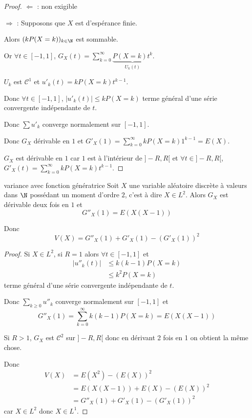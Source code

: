 \begin{proof}
    $\Leftarrow$ : non exigible 

    $\Rightarrow$ : Supposons que $X$ est d'espérance finie.
    

    Alors 
    $(k P(X = k))_{k \in \N}$ est sommable. 

    Or $\forall t \in [-1, 1]$, $G_X(t) = \sum_{k = 0}^{\infty} \underbrace{P(X = k) t^k}_{U_k(t)}$.

    $U_k$ est $\mathscr C^1$ et $u'_k(t) = k P(X = k) t^{k - 1}$.

    Donc $\forall t \in [-1, 1]$, $|u'_k(t)| \leqslant k P(X = k)$ terme général d'une série convergente 
    indépendante de $t$. 

    Donc $\sum u'_k$ converge normalement sur $[-1, 1]$.

    Donc $G_X$ dérivable en $1$ et $\displaystyle G'_X(1) = \sum_{k = 0}^{\infty} k P(X = k) 1^{k - 1} = E(X)$.


    $G_X$ est dérivable en $1$ car $1$ est à l'intérieur de $]-R, R[$
    et $\forall t \in ]-R, R[$, $\displaystyle G'_X(t) = \sum_{k = 0}^{\infty} k P(X = k) t^{k - 1}$.
\end{proof}

\begin{corollaire}{variance avec fonction génératrice}{}
    Soit $X$ une variable aléatoire discrète à  valeurs dans $\N$ possédant un moment 
    d'ordre $2$, c'est à dire $X \in L^2$. Alors 
    $G_X$ est dérivable deux fois en $1$ et
    $$ G''_X(1) = E(X(X - 1)) $$

    Donc $$ V(X) = G''_X(1) + G'_X(1) - (G'_X(1))^2 $$
\end{corollaire}

\begin{proof}
    Si $X \in L^2$, si $R = 1$ alors 
    $\forall t \in [-1, 1]$ et 
    \begin{align}
        |u''_k(t)| & \leqslant k(k - 1) P(X = k) \\
        & \leqslant k^2 P(X = k)
    \end{align}
    terme général d'une série convergente indépendante de $t$.

    Donc $\sum_{k \geqslant 0} u''_k$ converge normalement sur $[-1, 1]$ et 
    $$G''_X(1) = \sum_{k = 0}^{\infty} k (k - 1) P(X = k) = E(X(X - 1))$$

    Si $R > 1$, $G_X$ est $\mathscr C^2$ sur $]-R, R[$ donc en dérivant 2 fois en 1 on obtient 
    la même chose.

    Donc \begin{align}
        V(X) & = E(X^2) - (E(X))^2 \\
        & = E(X(X - 1)) + E(X) - (E(X))^2 \\
        & = G''_X(1) + G'_X(1) - (G'_X(1))^2
    \end{align}
    car $X \in L^2$ donc $X \in L^1$.
\end{proof}

